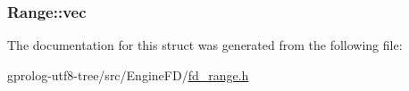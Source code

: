 \subsubsection[{\texorpdfstring{vec}{vec}}]{ Range\+::vec}\hypertarget{structRange_aa1fc33857cb97860b7c55a8f90ad6e3f}{}\label{structRange_aa1fc33857cb97860b7c55a8f90ad6e3f}


The documentation for this struct was generated from the following file\+:\begin{DoxyCompactItemize}
\item 
gprolog-\/utf8-\/tree/src/\+Engine\+F\+D/\hyperlink{fd__range_8h}{fd\+\_\+range.\+h}\end{DoxyCompactItemize}
